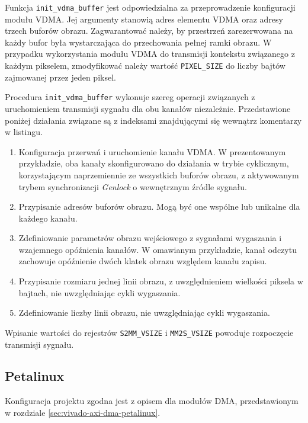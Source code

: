 
Funkcja \texttt{init\_vdma\_buffer} jest odpowiedzialna za przeprowadzenie konfiguracji modułu VDMA. Jej argumenty stanowią adres elementu VDMA oraz adresy trzech buforów obrazu. Zagwarantować należy, by przestrzeń zarezerwowana na każdy bufor była wystarczająca do przechowania pełnej ramki obrazu. W przypadku wykorzystania modułu VDMA do transmisji kontekstu związanego z każdym pikselem, zmodyfikować należy wartość \texttt{PIXEL\_SIZE} do liczby bajtów zajmowanej przez jeden piksel.

Procedura \texttt{init\_vdma\_buffer} wykonuje szereg operacji związanych z uruchomieniem transmisji sygnału dla obu kanałów niezależnie. Przedstawione poniżej działania związane są z indeksami znajdującymi się wewnątrz komentarzy w listingu.
\begin{enumerate}
	\item Konfiguracja przerwań i uruchomienie kanału VDMA.
	W prezentowanym przykładzie, oba kanały skonfigurowano do działania w trybie cyklicznym, korzystającym naprzemiennie ze wszystkich buforów obrazu, z aktywowanym trybem synchronizacji \emph{Genlock} o wewnętrznym źródle sygnału.
	
	\item Przypisanie adresów buforów obrazu. Mogą być one wspólne lub unikalne dla każdego kanału.
	
	\item Zdefiniowanie parametrów obrazu wejściowego z sygnałami wygaszania i wzajemnego opóźnienia kanałów.
	W omawianym przykładzie, kanał odczytu zachowuje opóźnienie dwóch klatek obrazu względem kanału zapisu.
	
	\item Przypisanie rozmiaru jednej linii obrazu, z uwzględnieniem wielkości piksela w bajtach, nie uwzględniając cykli wygaszania.
	
	\item Zdefiniowanie liczby linii obrazu, nie uwzględniając cykli wygaszania.
\end{enumerate}

Wpisanie wartości do rejestrów \texttt{S2MM\_VSIZE} i \texttt{MM2S\_VSIZE} powoduje rozpoczęcie transmisji sygnału.

\subsection{Petalinux}
Konfiguracja projektu zgodna jest z opisem dla modułów DMA, przedstawionym w rozdziale \ref{sec:vivado-axi-dma-petalinux}. %

